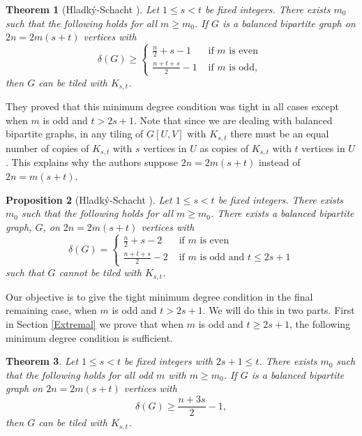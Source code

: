 \documentclass[oneside,12pt]{memoir}
\newtheorem{theorem}{Theorem}[section]
\newtheorem{proposition}[theorem]{Proposition}
\begin{document}
\begin{theorem}[Hladk\'{y}-Schacht \cite{HS}]\label{HS ub}
Let $1\leq s<t$ be fixed integers.  There exists $m_0$ such that the following holds for all $m\geq m_0$. If $G$ is a balanced bipartite graph on $2n=2m(s+t)$ vertices with $$\delta(G)\geq \left\lbrace \begin{array}{ll} \frac{n}{2}+s-1   & \text{ if } m \text{ is even } \\
               \frac {n+t+s}{2}-1 & \text{ if } m \text{ is odd,} \end{array} \right. $$
then $G$ can be tiled with $K_{s,t}$.
\end{theorem}
They proved that this minimum degree condition was tight in all cases except when $m$ is odd and $t> 2s+1$.  Note that since we are dealing with balanced bipartite graphs, in any tiling of $G[U,V]$ with $K_{s,t}$ there must be an equal number of copies of $K_{s,t}$ with $s$ vertices in $U$ as copies of $K_{s,t}$ with $t$ vertices in $U$.  This explains why the authors \cite{HS} suppose $2n=2m(s+t)$ instead of $2n=m(s+t)$.  

\begin{proposition}[Hladk\'{y}-Schacht \cite{HS}]
Let $1\leq s<t$ be fixed integers.  There exists $m_0$ such that the following holds for all $m\geq m_0$. There exists a balanced bipartite graph, $G$, on $2n=2m(s+t)$ vertices with
$$\delta(G)= \left\lbrace \begin{array}{ll} \frac{n}{2}+s-2   & \text{ if } m \text{ is even } \\
              \frac {n+t+s}{2}-2 & \text{ if } m \text{ is odd and } t\leq 2s+1 \end{array} \right. $$
such that $G$ cannot be tiled with $K_{s,t}$.
\end{proposition}

Our objective is to give the tight minimum degree condition in the final remaining case, when $m$ is odd and $t> 2s+1$. We will do this in two parts.  First in Section \ref{Extremal} we prove that when $m$ is odd and $t\geq 2s+1$, the following minimum degree condition is sufficient.

\begin{theorem}\label{tilemain}
Let $1\leq s<t$ be fixed integers with $2s+1\leq t$.  There exists $m_0$ such that the following holds for all odd $m$ with $m\geq m_0$. If $G$ is a balanced bipartite graph on $2n=2m(s+t)$ vertices with $$\delta(G)\geq \frac {n+3s}{2}-1,$$ then $G$ can be tiled with $K_{s,t}$.
\end{theorem}
\end{document}
